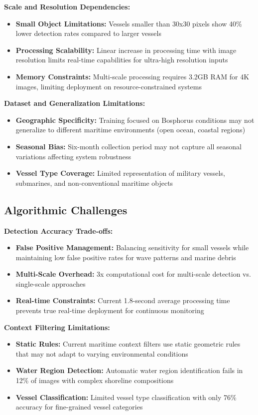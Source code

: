 \documentclass[12pt,a4paper]{report}
\begin{document}
\textbf{Scale and Resolution Dependencies:}
\begin{itemize}
    \item \textbf{Small Object Limitations:} Vessels smaller than 30x30 pixels show 40\% lower detection rates compared to larger vessels
    \item \textbf{Processing Scalability:} Linear increase in processing time with image resolution limits real-time capabilities for ultra-high resolution inputs
    \item \textbf{Memory Constraints:} Multi-scale processing requires 3.2GB RAM for 4K images, limiting deployment on resource-constrained systems
\end{itemize}

\textbf{Dataset and Generalization Limitations:}
\begin{itemize}
    \item \textbf{Geographic Specificity:} Training focused on Bosphorus conditions may not generalize to different maritime environments (open ocean, coastal regions)
    \item \textbf{Seasonal Bias:} Six-month collection period may not capture all seasonal variations affecting system robustness
    \item \textbf{Vessel Type Coverage:} Limited representation of military vessels, submarines, and non-conventional maritime objects
\end{itemize}

\subsection{Algorithmic Challenges}

\textbf{Detection Accuracy Trade-offs:}
\begin{itemize}
    \item \textbf{False Positive Management:} Balancing sensitivity for small vessels while maintaining low false positive rates for wave patterns and marine debris
    \item \textbf{Multi-Scale Overhead:} 3x computational cost for multi-scale detection vs. single-scale approaches
    \item \textbf{Real-time Constraints:} Current 1.8-second average processing time prevents true real-time deployment for continuous monitoring
\end{itemize}

\textbf{Context Filtering Limitations:}
\begin{itemize}
    \item \textbf{Static Rules:} Current maritime context filters use static geometric rules that may not adapt to varying environmental conditions
    \item \textbf{Water Region Detection:} Automatic water region identification fails in 12\% of images with complex shoreline compositions
    \item \textbf{Vessel Classification:} Limited vessel type classification with only 76\% accuracy for fine-grained vessel categories
\end{itemize}
\end{document}
